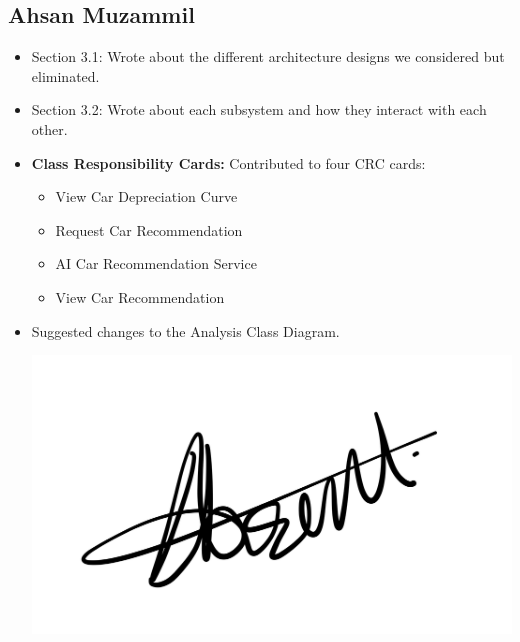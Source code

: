 \documentclass[]{article}
\begin{document}
\subsection{Ahsan Muzammil}
\begin{itemize}
    \item Section 3.1: Wrote about the different architecture designs we considered but eliminated.
    \item Section 3.2: Wrote about each subsystem and how they interact with each other.
    \item \textbf{Class Responsibility Cards:} Contributed to four CRC cards:
    \begin{itemize}
        \item View Car Depreciation Curve
        \item Request Car Recommendation
        \item AI Car Recommendation Service
        \item View Car Recommendation
    \end{itemize}
    \item Suggested changes to the Analysis Class Diagram.
    \begin{center}
        \includegraphics[scale=0.1]{ahsan.jpeg}
    \end{center}
\end{itemize}
\end{document}
